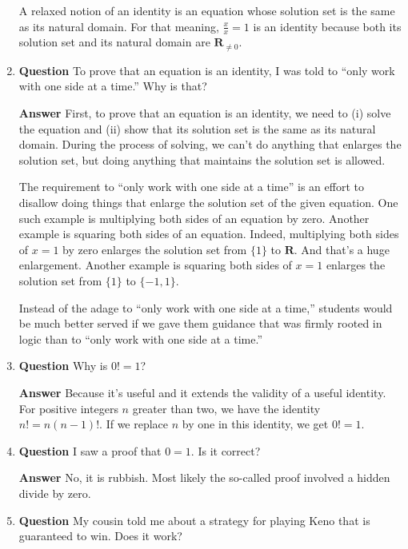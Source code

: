 \documentclass[11pt]{article}
\newcommand{\reals}{\mathbf{R}}
\newcounter{ex}\setcounter{ex}{0}
\begin{document}
\begin{enumerate}
\quad A relaxed notion of an identity is an equation whose
solution set is the same as its natural domain. For that meaning, \(\displaystyle \frac{x}{x} = 1\)
is an identity because both its solution set and its natural domain are \(\reals_{\neq 0}\).

\item \textbf{Question} To prove that an equation is an identity, I was
 told to ``only work with one side at a time.'' Why is that?

 \textbf{Answer} First, to prove that an equation is an identity,
 we need to (i) solve the equation and (ii) show that its solution
 set is the same as its natural domain. During the process of solving,
 we can't do anything that enlarges the solution set, but doing anything
 that maintains the solution set is allowed.
 
 \quad The requirement to ``only work with one side at a time''
 is an effort to disallow doing things that enlarge the solution set of
 the given equation. One  such example is multiplying both sides of an equation by zero. Another
 example is squaring both sides of an equation. Indeed, multiplying
 both sides of \(x = 1\) by zero enlarges the solution set from \(\{1\}\)
to \(\reals\). And that's a huge enlargement.  Another example is squaring both sides of 
\(x=1\) enlarges the solution set from \(\{1\}\) to \(\{-1,1\}\).

\quad Instead of the adage to ``only work with one side at a time,'' 
students would be much better served if we gave them guidance that was firmly
rooted in logic than to ``only work with one side at a time.'' 

\item  \textbf{Question} Why is \(0! = 1\)?

 \textbf{Answer} Because it's useful and it extends the validity of a useful identity. For positive integers \(n\) greater than two, we 
 have the identity \(n! = n (n-1)!\). If we replace \(n\) by one in this identity, 
 we get \(0! = 1\). 

\item  \textbf{Question} I saw a proof that \(0=1\).  Is it correct?

  \textbf{Answer}  No, it is rubbish. Most likely the so-called proof involved a hidden divide by zero.



\item  \textbf{Question} My cousin told me about a strategy for playing Keno that is guaranteed to win. Does it work?


\end{enumerate}
\end{document}
